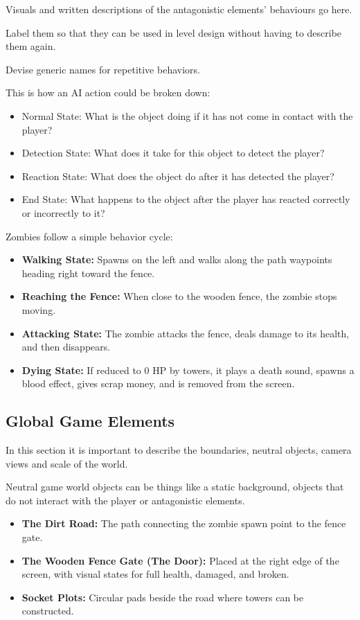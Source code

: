 \begin{guidance}
Visuals and written descriptions of the antagonistic elements’ behaviours go here.

Label them so that they can be used in level design without having to describe them again.

Devise generic names for repetitive behaviors.

This is how an AI action could be broken down:

\begin{itemize}[label=\textendash]
  \item Normal State: What is the object doing if it has not come in contact with the player?
  \item Detection State: What does it take for this object to detect the player?
  \item Reaction State: What does the object do after it has detected the player?
  \item End State: What happens to the object after the player has reacted correctly or incorrectly to it?
\end{itemize}
\end{guidance}
Zombies follow a simple behavior cycle:
\begin{itemize}[label=\textbullet]
  \item \textbf{Walking State:} Spawns on the left and walks along the path waypoints heading right toward the fence.
  \item \textbf{Reaching the Fence:} When close to the wooden fence, the zombie stops moving.
  \item \textbf{Attacking State:} The zombie attacks the fence, deals damage to its health, and then disappears.
  \item \textbf{Dying State:} If reduced to 0 HP by towers, it plays a death sound, spawns a blood effect, gives scrap money, and is removed from the screen.
\end{itemize}

\subsection{Global Game Elements}

\begin{guidance}
In this section it is important to describe the boundaries, neutral objects, camera views and scale of the world.

Neutral game world objects can be things like a static background, objects that do not interact with the player or antagonistic elements.
\end{guidance}
\begin{itemize}[label=\textbullet]
  \item \textbf{The Dirt Road:} The path connecting the zombie spawn point to the fence gate.
  \item \textbf{The Wooden Fence Gate (The Door):} Placed at the right edge of the screen, with visual states for full health, damaged, and broken.
  \item \textbf{Socket Plots:} Circular pads beside the road where towers can be constructed.
\end{itemize}

